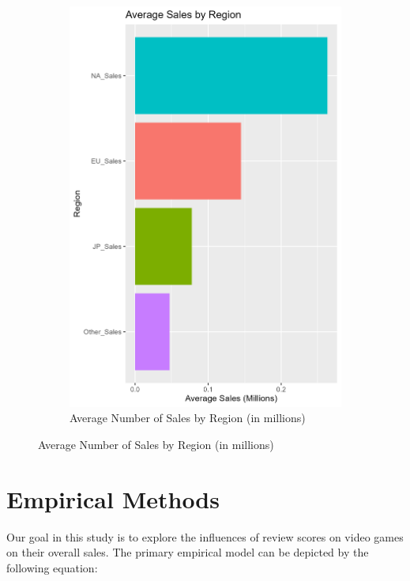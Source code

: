 \documentclass[12pt,english]{article}
\begin{document}
\begin{figure}[ht]
\begin{subfigure}{0.49\linewidth}
    \includegraphics[width=\linewidth]{Figures/avg_sales_region.png}
    \caption{Average Number of Sales by Region (in millions)}
    \label{fig:fig2}
\end{subfigure}
\label{fig:combined1}
\end{figure}

\newpage
\section{Empirical Methods}\label{sec:methods}
Our goal in this study is to explore the influences of review scores on video games on their overall sales. The primary empirical model can be depicted by the following equation: 
\end{document}
